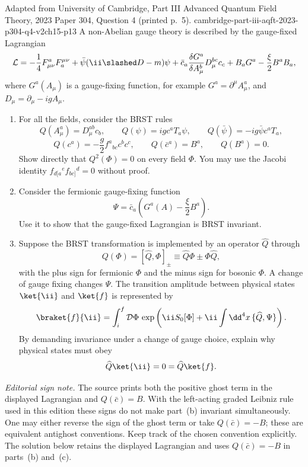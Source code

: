 \begin{enumerate}
  {Adapted from University of Cambridge, Part III Advanced Quantum Field
  Theory, 2023 Paper 304, Question 4 (printed p.~5).}
  {cambridge-part-iii-aqft-2023-p304-q4-v2ch15-p13}
  A non-Abelian gauge theory is described by the gauge-fixed Lagrangian
  \[
    \mathcal L=-\frac14F^a_{\mu\nu}F_a^{\mu\nu}
      +\bar\psi(\ii\slashed D-m)\psi
      +\bar c_a\frac{\delta G^a}{\delta A_\mu^b}D_\mu^{bc}c_c
      +B_aG^a-\frac\xi2B^aB_a,
  \]
  where \(G^a(A_\mu)\) is a gauge-fixing function, for example
  \(G^a=\partial^\mu A_\mu^a\), and
  \(D_\mu=\partial_\mu-igA_\mu\).
  \begin{enumerate}
    \item[(a)] For all the fields, consider the BRST rules
      \[
        Q(A_\mu^a)=D_\mu^{ab}c_b,
        \qquad Q(\psi)=igc^aT_a\psi,
        \qquad Q(\bar\psi)=-ig\bar\psi c^aT_a,
      \]
      \[
        Q(c^a)=-\frac g2f^a{}_{bc}c^bc^c,
        \qquad Q(\bar c^a)=B^a,
        \qquad Q(B^a)=0.
      \]
      Show directly that \(Q^2(\Phi)=0\) on every field \(\Phi\).  You may
      use the Jacobi identity \(f_{d[a}{}^ef_{bc]}{}^d=0\) without proof.
    \item[(b)] Consider the fermionic gauge-fixing function
      \[
        \Psi=\bar c_a\left(G^a(A)-\frac\xi2B^a\right).
      \]
      Use it to show that the gauge-fixed Lagrangian is BRST invariant.
    \item[(c)] Suppose the BRST transformation is implemented by an
      operator \(\widehat Q\) through
      \[
        Q(\Phi)=[\widehat Q,\Phi]_\pm
          \equiv\widehat Q\Phi\pm\Phi\widehat Q,
      \]
      with the plus sign for fermionic \(\Phi\) and the minus sign for
      bosonic \(\Phi\).  A change of gauge fixing changes \(\Psi\).  The
      transition amplitude between physical states \(\ket{\ii}\) and
      \(\ket{f}\) is represented by
      \[
        \braket{f}{\ii}
          =\int_i^f\mathcal D\Phi\,
            \exp\left(\ii S_0[\Phi]
              +\ii\int \dd^4x\,\{\widehat Q,\Psi\}\right).
      \]
      By demanding invariance under a change of gauge choice, explain why
      physical states must obey
      \[
        \widehat Q\ket{\ii}=0=\widehat Q\ket{f}.
      \]
  \end{enumerate}

  \emph{Editorial sign note.}  The source prints both the positive ghost
  term in the displayed Lagrangian and \(Q(\bar c)=B\).  With the
  left-acting graded Leibniz rule used in this edition these signs do not make
  part~(b) invariant simultaneously.  One may either reverse the sign of the
  ghost term or take \(Q(\bar c)=-B\); these are equivalent antighost
  conventions.  Keep track of the chosen convention explicitly.  The
  solution below retains the displayed Lagrangian and uses
  \(Q(\bar c)=-B\) in parts~(b) and~(c).


\end{enumerate}
